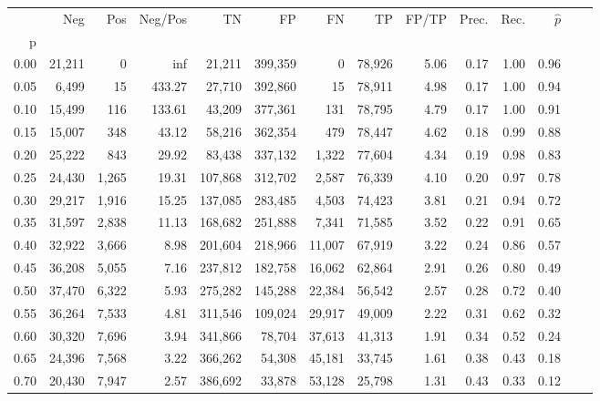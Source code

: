\begin{tabular}{rrrrrrrrrrrrrr}
\toprule
{} &     Neg &    Pos & Neg/Pos &       TN &       FP &      FN &      TP & FP/TP & Prec. &  Rec. & $\hat{p}$ \\
p    &         &        &         &          &          &         &         &       &       &       &           \\
\midrule
0.00 &  21,211 &      0 &     inf &   21,211 &  399,359 &       0 &  78,926 &  5.06 &  0.17 &  1.00 &      0.96 \\
0.05 &   6,499 &     15 &  433.27 &   27,710 &  392,860 &      15 &  78,911 &  4.98 &  0.17 &  1.00 &      0.94 \\
0.10 &  15,499 &    116 &  133.61 &   43,209 &  377,361 &     131 &  78,795 &  4.79 &  0.17 &  1.00 &      0.91 \\
0.15 &  15,007 &    348 &   43.12 &   58,216 &  362,354 &     479 &  78,447 &  4.62 &  0.18 &  0.99 &      0.88 \\
0.20 &  25,222 &    843 &   29.92 &   83,438 &  337,132 &   1,322 &  77,604 &  4.34 &  0.19 &  0.98 &      0.83 \\
0.25 &  24,430 &  1,265 &   19.31 &  107,868 &  312,702 &   2,587 &  76,339 &  4.10 &  0.20 &  0.97 &      0.78 \\
0.30 &  29,217 &  1,916 &   15.25 &  137,085 &  283,485 &   4,503 &  74,423 &  3.81 &  0.21 &  0.94 &      0.72 \\
0.35 &  31,597 &  2,838 &   11.13 &  168,682 &  251,888 &   7,341 &  71,585 &  3.52 &  0.22 &  0.91 &      0.65 \\
0.40 &  32,922 &  3,666 &    8.98 &  201,604 &  218,966 &  11,007 &  67,919 &  3.22 &  0.24 &  0.86 &      0.57 \\
0.45 &  36,208 &  5,055 &    7.16 &  237,812 &  182,758 &  16,062 &  62,864 &  2.91 &  0.26 &  0.80 &      0.49 \\
0.50 &  37,470 &  6,322 &    5.93 &  275,282 &  145,288 &  22,384 &  56,542 &  2.57 &  0.28 &  0.72 &      0.40 \\
0.55 &  36,264 &  7,533 &    4.81 &  311,546 &  109,024 &  29,917 &  49,009 &  2.22 &  0.31 &  0.62 &      0.32 \\
0.60 &  30,320 &  7,696 &    3.94 &  341,866 &   78,704 &  37,613 &  41,313 &  1.91 &  0.34 &  0.52 &      0.24 \\
0.65 &  24,396 &  7,568 &    3.22 &  366,262 &   54,308 &  45,181 &  33,745 &  1.61 &  0.38 &  0.43 &      0.18 \\
0.70 &  20,430 &  7,947 &    2.57 &  386,692 &   33,878 &  53,128 &  25,798 &  1.31 &  0.43 &  0.33 &      0.12 \\

\end{tabular}
